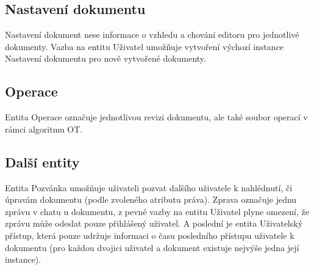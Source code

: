 \subsection{Nastavení dokumentu}\label{subsec:nastaveníDokumentu}

Nastavení dokument nese informace o vzhledu a chování editoru pro jednotlivé dokumenty.
Vazba na entitu Uživatel umožňuje vytvoření výchozí instance Nastavení dokumentu pro nově vytvořené dokumenty.

\subsection{Operace}\label{subsec:operace}

Entita Operace označuje jednotlivou revizi dokumentu, ale také soubor operací v rámci algoritmu \gls{OT}.

\subsection{Další entity}\label{subsec:dalšíEntity}

Entita Pozvánka umožňuje uživateli pozvat dalšího uživatele k nahlédnutí, či úpravám dokumentu (podle zvoleného atributu práva).
Zprava označuje jednu zprávu v chatu u dokumentu, z pevné vazby na entitu Uživatel plyne omezení, že zprávu může odeslat pouze přihlášený uživatel.
A poslední je entita Uživatelský přístup, která pouze udržuje informaci o času posledního přístupu uživatele k dokumentu (pro každou dvojici uživatel a dokument existuje nejvýše jedna její instance).
